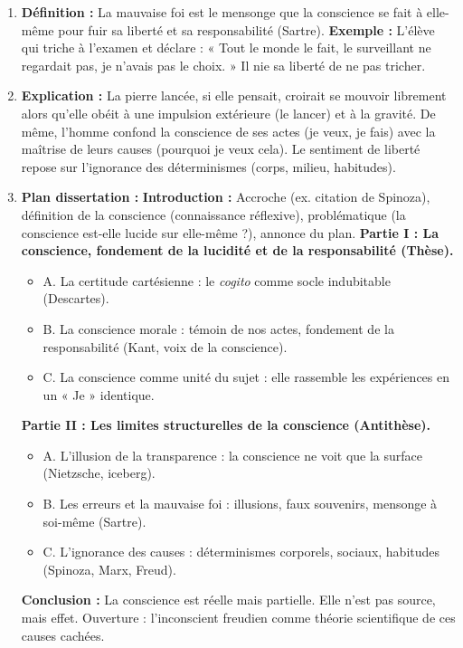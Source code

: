 \documentclass[11pt]{article}
\begin{document}
\begin{corrige}
\begin{enumerate}
\item \textbf{Définition :} La mauvaise foi est le mensonge que la conscience se fait à elle-même pour fuir sa liberté et sa responsabilité (Sartre). \textbf{Exemple :} L'élève qui triche à l'examen et déclare : « Tout le monde le fait, le surveillant ne regardait pas, je n'avais pas le choix. » Il nie sa liberté de ne pas tricher.
\item \textbf{Explication :} La pierre lancée, si elle pensait, croirait se mouvoir librement alors qu'elle obéit à une impulsion extérieure (le lancer) et à la gravité. De même, l'homme confond la conscience de ses actes (je veux, je fais) avec la maîtrise de leurs causes (pourquoi je veux cela). Le sentiment de liberté repose sur l'ignorance des déterminismes (corps, milieu, habitudes).
\item \textbf{Plan dissertation :}
\textbf{Introduction :} Accroche (ex. citation de Spinoza), définition de la conscience (connaissance réflexive), problématique (la conscience est-elle lucide sur elle-même ?), annonce du plan.
\textbf{Partie I : La conscience, fondement de la lucidité et de la responsabilité (Thèse).}
\begin{itemize}
    \item A. La certitude cartésienne : le \emph{cogito} comme socle indubitable (Descartes).
    \item B. La conscience morale : témoin de nos actes, fondement de la responsabilité (Kant, voix de la conscience).
    \item C. La conscience comme unité du sujet : elle rassemble les expériences en un « Je » identique.
\end{itemize}
\textbf{Partie II : Les limites structurelles de la conscience (Antithèse).}
\begin{itemize}
    \item A. L'illusion de la transparence : la conscience ne voit que la surface (Nietzsche, iceberg).
    \item B. Les erreurs et la mauvaise foi : illusions, faux souvenirs, mensonge à soi-même (Sartre).
    \item C. L'ignorance des causes : déterminismes corporels, sociaux, habitudes (Spinoza, Marx, Freud).
\end{itemize}
\textbf{Conclusion :} La conscience est réelle mais partielle. Elle n'est pas source, mais effet. Ouverture : l'inconscient freudien comme théorie scientifique de ces causes cachées.
\end{enumerate}
\end{corrige}
\end{document}
